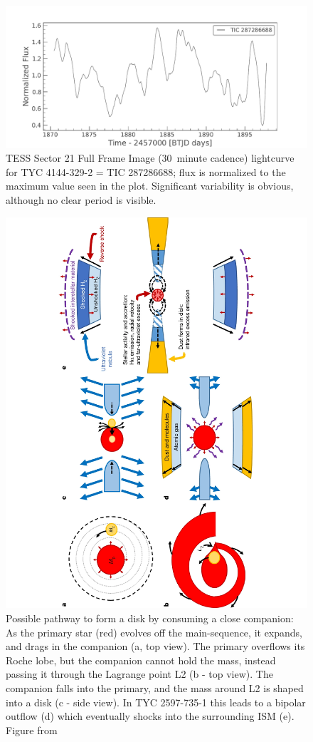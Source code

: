 \documentclass[letterpaper,11pt]{article}
\begin{document}
\begin{figure}
\includegraphics[width=.7\textwidth]{TESSlc}
\caption{TESS Sector 21 Full Frame Image (30~minute cadence) lightcurve for TYC 4144-329-2 = TIC 287286688;
               flux is normalized to the maximum value seen in the plot. Significant variability is obvious, although no clear period is visible.}
\label{fig:TESS}
\end{figure}


\begin{figure}[htbp]
\begin{center}

\includegraphics[angle=-90,width=.7\textwidth]{nature_sketch}
\vspace{-15mm}
\caption{Possible pathway to form a disk by consuming a close companion: As the primary star (red) evolves off the main-sequence, it expands, and drags in the companion (a, top view). The primary overflows its Roche lobe, but the companion cannot hold the mass, instead passing it through the Lagrange point L2 (b - top view). The companion falls into the primary, and the mass around L2 is shaped into a disk (c - side view). In TYC 2597-735-1 this leads to a bipolar outflow (d) which eventually shocks into the surrounding ISM (e). Figure from \cite{2020Natur.587..387H}}
\label{fig:naturesketch}
\end{center}
\end{figure}
\end{document}

